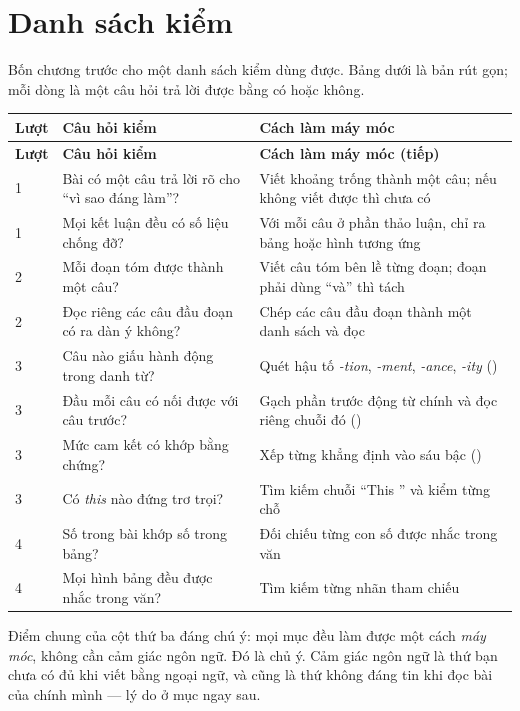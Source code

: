 \documentclass[../../english.tex]{subfiles}
\begin{document}
\section{Danh sách kiểm}

Bốn chương trước cho một danh sách kiểm dùng được. Bảng dưới là bản rút gọn; mỗi dòng là một câu hỏi trả lời được bằng có hoặc không.

\begin{center}\footnotesize
{}
\begin{longtable}{@{}L{1.6cm}L{6.4cm}L{6.4cm}@{}}
\toprule
\textbf{Lượt} & \textbf{Câu hỏi kiểm} & \textbf{Cách làm máy móc}\\
\midrule
\endfirsthead
\toprule
\textbf{Lượt} & \textbf{Câu hỏi kiểm} & \textbf{Cách làm máy móc (tiếp)}\\
\midrule
{} & Bài có một câu trả lời rõ cho ``vì sao đáng làm''? & Viết khoảng trống thành một câu; nếu không viết được thì chưa có\\
1 & Mọi kết luận đều có số liệu chống đỡ? & Với mỗi câu ở phần thảo luận, chỉ ra bảng hoặc hình tương ứng\\
2 & Mỗi đoạn tóm được thành một câu? & Viết câu tóm bên lề từng đoạn; đoạn phải dùng ``và'' thì tách\\
2 & Đọc riêng các câu đầu đoạn có ra dàn ý không? & Chép các câu đầu đoạn thành một danh sách và đọc\\
3 & Câu nào giấu hành động trong danh từ? & Quét hậu tố \emph{-tion}, \emph{-ment}, \emph{-ance}, \emph{-ity} ()\\
3 & Đầu mỗi câu có nối được với câu trước? & Gạch phần trước động từ chính và đọc riêng chuỗi đó ()\\
3 & Mức cam kết có khớp bằng chứng? & Xếp từng khẳng định vào sáu bậc ()\\
3 & Có \emph{this} nào đứng trơ trọi? & Tìm kiếm chuỗi ``This '' và kiểm từng chỗ\\
4 & Số trong bài khớp số trong bảng? & Đối chiếu từng con số được nhắc trong văn\\
4 & Mọi hình bảng đều được nhắc trong văn? & Tìm kiếm từng nhãn tham chiếu\\
\bottomrule
\end{longtable}
\end{center}

Điểm chung của cột thứ ba đáng chú ý: mọi mục đều làm được một cách \emph{máy móc}, không cần cảm giác ngôn ngữ. Đó là chủ ý. Cảm giác ngôn ngữ là thứ bạn chưa có đủ khi viết bằng ngoại ngữ, và cũng là thứ không đáng tin khi đọc bài của chính mình --- lý do ở mục ngay sau.
\end{document}
